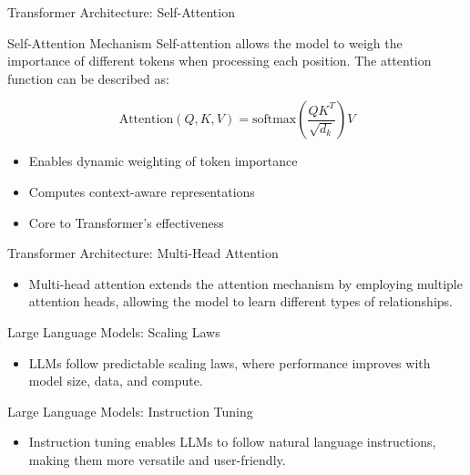 \documentclass[aspectratio=169]{beamer}
\begin{document}
\begin{frame}{Transformer Architecture: Self-Attention}
\begin{block}{Self-Attention Mechanism}
Self-attention allows the model to weigh the importance of different tokens when processing each position. The attention function can be described as:
\end{block}

\begin{equation}
\text{Attention}(Q, K, V) = \text{softmax}\left(\frac{QK^T}{\sqrt{d_k}}\right)V
\end{equation}

\begin{itemize}
  \item Enables dynamic weighting of token importance
  \item Computes context-aware representations
  \item Core to Transformer's effectiveness
\end{itemize}
\end{frame}

\begin{frame}{Transformer Architecture: Multi-Head Attention}
\begin{itemize}
  \item Multi-head attention extends the attention mechanism by employing multiple attention heads, allowing the model to learn different types of relationships.
\end{itemize}
\end{frame}

\begin{frame}{Large Language Models: Scaling Laws}
\begin{itemize}
  \item LLMs follow predictable scaling laws, where performance improves with model size, data, and compute.
\end{itemize}
\end{frame}

\begin{frame}{Large Language Models: Instruction Tuning}
\begin{itemize}
  \item Instruction tuning enables LLMs to follow natural language instructions, making them more versatile and user-friendly.
\end{itemize}
\end{frame}
\end{document}
